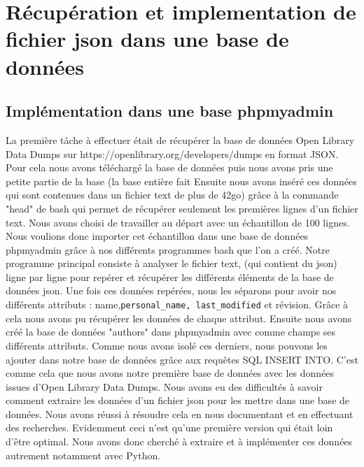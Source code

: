\documentclass[12pt, a4paper]{article}
\begin{document}
\section{Récupération et implementation de fichier json dans une base de données}
\subsection{Implémentation dans une base phpmyadmin}
La première tâche à effectuer était de récupérer la base de données Open Library Data Dumps sur https://openlibrary.org/developers/dumps en format JSON. Pour cela nous avons téléchargé la base de données puis nous avons pris une petite partie de la base (la base entière fait Ensuite nous avons inséré ces données qui sont contenues dans un fichier text de plus de 42go) grâce à la commande "head" de bash qui permet de récupérer seulement les premières lignes d'un fichier text. Nous avons choisi de travailler au départ avec un échantillon de 100 lignes. Nous voulions donc importer cet échantillon dans une base de données phpmyadmin grâce à nos différents programmes bash que l'on a créé.
Notre programme principal consiste à analyser le fichier text, (qui contient du json) ligne par ligne pour repérer et récupérer les différents éléments de la base de données json. Une fois ces données repérées, nous les séparons pour avoir nos différents attributs : name,\verb?personal_name, last_modified? et révision. Grâce à cela nous avons pu récupérer les données de chaque attribut. Ensuite nous avons créé la base de données "authors" dans phpmyadmin avec comme champs ses différents attributs. Comme nous avons isolé ces derniers, nous pouvons les ajouter dans notre base de données grâce aux requêtes SQL INSERT INTO. C'est comme cela que nous avons notre première base de données avec les données issues d'Open Library Data Dumps.
Nous avons eu des difficultés à savoir comment extraire les données d'un fichier json pour les mettre dans une base de données. Nous avons réussi à résoudre cela en nous documentant et en effectuant des recherches.
Evidemment ceci n'est qu'une première version qui était loin d'être optimal. Nous avons donc cherché à extraire et à implémenter ces données autrement notamment avec Python.
\end{document}
